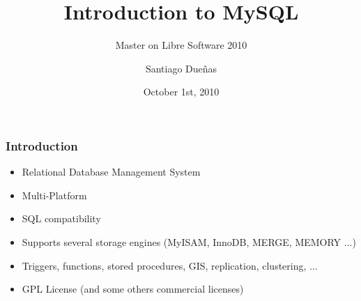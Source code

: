 \documentclass{beamer}
\begin{document}
\title{Introduction to MySQL}
\subtitle{Master on Libre Software 2010}
\author{Santiago Dueñas} 
\date{October 1st, 2010}




\begin{frame}
\frametitle{Introduction}

\begin{itemize}
\item Relational Database Management System
\item Multi-Platform
\item SQL compatibility
\item Supports several storage engines (MyISAM, InnoDB, MERGE, MEMORY ...)
\item Triggers, functions, stored procedures, GIS, replication, clustering, ...
\item GPL License (and some others commercial licenses)
\end{itemize}

\end{frame}

\end{document}
